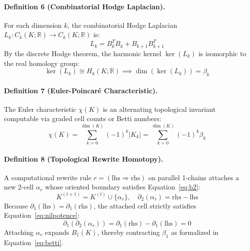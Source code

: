 \documentclass[10pt,a4paper]{article}
\begin{document}
\paragraph{Definition 6 (Combinatorial Hodge Laplacian).}
For each dimension $k$, the combinatorial Hodge Laplacian $L_k : C_k(K; \mathbb{R}) \to C_k(K; \mathbb{R})$ is:
\begin{equation}
L_k = B_k^T B_k + B_{k+1} B_{k+1}^T
\label{eq:laplacian}
\end{equation}
By the discrete Hodge theorem, the harmonic kernel $\ker(L_k)$ is isomorphic to the real homology group:
\begin{equation}
\ker(L_k) \cong H_k(K; \mathbb{R}) \implies \dim(\ker(L_k)) = \beta_k
\label{eq:hodge_isomorphism}
\end{equation}

\paragraph{Definition 7 (Euler-Poincaré Characteristic).}
The Euler characteristic $\chi(K)$ is an alternating topological invariant computable via graded cell counts or Betti numbers:
\begin{equation}
\chi(K) = \sum_{k=0}^{\dim(K)} (-1)^k |K_k| = \sum_{k=0}^{\dim(K)} (-1)^k \beta_k
\label{eq:euler}
\end{equation}

\paragraph{Definition 8 (Topological Rewrite Homotopy).}
A computational rewrite rule $r = (\text{lhs} \Rightarrow \text{rhs})$ on parallel 1-chains attaches a new 2-cell $\alpha_r$ whose oriented boundary satisfies Equation~\ref{eq:b2}:
\begin{equation}
K^{(t+1)} = K^{(t)} \cup \{\alpha_r\}, \quad \partial_2(\alpha_r) = \text{rhs} - \text{lhs}
\label{eq:rewrite_attach}
\end{equation}
Because $\partial_1(\text{lhs}) = \partial_1(\text{rhs})$, the attached cell strictly satisfies Equation~\ref{eq:nilpotence}:
\begin{equation}
\partial_1(\partial_2(\alpha_r)) = \partial_1(\text{rhs}) - \partial_1(\text{lhs}) = 0
\label{eq:rewrite_nilpotence}
\end{equation}
Attaching $\alpha_r$ expands $B_1(K)$, thereby contracting $\beta_1$ as formalized in Equation~\ref{eq:betti}.
\end{document}
